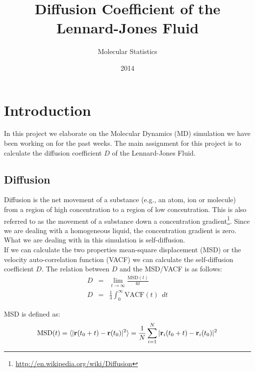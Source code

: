 \documentclass{article}
\title{Diffusion Coefficient of the Lennard-Jones Fluid}
\author{Molecular Statistics}
\date{2014}
\begin{document}


\maketitle

\section{Introduction}

In this project we elaborate on the Molecular Dynamics (MD) simulation we have been working on for the past weeks.
The main assignment for this project is to calculate the diffusion coefficient $D$ of the Lennard-Jones Fluid.\\



\subsection{Diffusion}

Diffusion is the net movement of a substance (e.g., an atom, ion or molecule) from a region of high concentration to a region of low concentration.
This is also referred to as the movement of a substance down a concentration gradient\footnote{\href{http://en.wikipedia.org/wiki/Diffusion}{http://en.wikipedia.org/wiki/Diffusion}}.
Since we are dealing with a homogeneous liquid, the concentration gradient is zero.
What we are dealing with in this simulation is self-diffusion.\\

If we can calculate the two properties mean-square displacement (MSD)
or the velocity auto-correlation function (VACF)
we can calculate the self-diffusion coefficient $D$.
The relation between $D$ and the MSD/VACF is as follows:
\begin{eqnarray}
    D &=& \lim_{t\rightarrow \infty} \frac{\mathrm{MSD}(t)}{6t}\\
    D &=& \frac{1}{3} \int_0^\infty \mathrm{VACF}(t) \ \ dt
\end{eqnarray}

MSD is defined as:
\begin{eqnarray}
    \mathrm{MSD}(t) = \langle |{\bf r}(t_0 + t) - {\bf r}(t_0)|^2 \rangle
    = \frac{1}{N} \sum_{i=1}^N | {\bf r}_i(t_0 + t) - {\bf r}_i(t_0)  |^2
\end{eqnarray}
\end{document}
